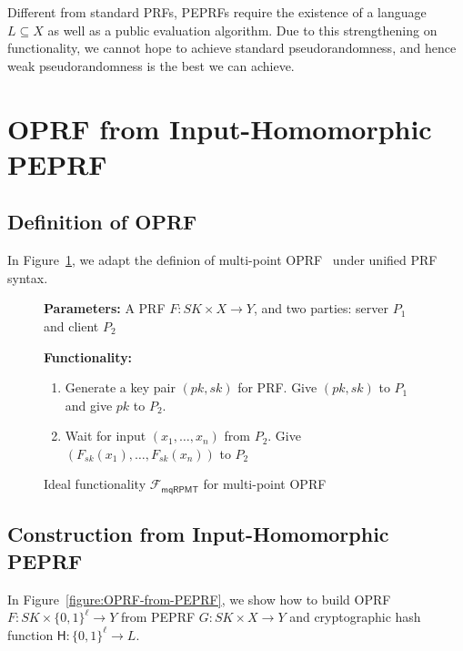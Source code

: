 \documentclass[a4paper,10pt]{article}
\newcommand{\FuncMQRPMT}{\mathcal{F}_\mathsf{mqRPMT}}
\begin{document}
\begin{remark}
    Different from standard PRFs, PEPRFs require the existence 
    of a language $L \subseteq X$ as well as a public evaluation algorithm.
    Due to this strengthening on functionality, 
    we cannot hope to achieve standard pseudorandomness, 
    and hence weak pseudorandomness is the best we can achieve.   
\end{remark} 


\section{OPRF from Input-Homomorphic PEPRF}\label{sec:OPRF-from-PEPRF}
\subsection{Definition of OPRF}
In Figure~\ref{figure:func-oprf}, 
we adapt the definion of multi-point OPRF~\cite{CM-CRYPTO-2020} under unified PRF syntax.   

\begin{figure}[!hbtp]
\begin{framed}
\begin{minipage}[center]{\textwidth}
\begin{trivlist}
\item \textbf{Parameters:} A PRF $F: SK \times X \rightarrow Y$, and two parties: server $P_1$ and client $P_2$

\item \textbf{Functionality:}
\begin{enumerate}
\item Generate a key pair $(pk, sk)$ for PRF. Give $(pk, sk)$ to $P_1$ and give $pk$ to $P_2$. 
\item Wait for input $(x_1, \dots, x_n)$ from $P_2$. Give $(F_{sk}(x_1), \dots, F_{sk}(x_n))$ to $P_2$
\end{enumerate}
\end{trivlist}
\end{minipage}
\end{framed}
\caption{Ideal functionality $\FuncMQRPMT$ for multi-point OPRF}\label{figure:func-oprf}
\end{figure}

\subsection{Construction from Input-Homomorphic PEPRF}
In Figure~\ref{figure:OPRF-from-PEPRF}, 
we show how to build OPRF $F: SK \times \{0,1\}^{\ell} \rightarrow Y$ from PEPRF $G: SK \times X \rightarrow Y$ 
and cryptographic hash function $\mathsf{H}: \{0,1\}^\ell \rightarrow L$. 
\end{document}
